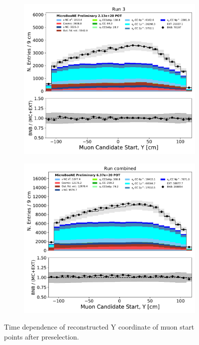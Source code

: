 \begin{figure}[hbt!]
\begin{center}
\begin{subfigure}[b]{0.35\textwidth}
    \end{subfigure}
    \begin{subfigure}[b]{0.35\textwidth}
        \centering
        \includegraphics[width=1.00\textwidth]{NuMuCCsel/Images/Ryan/Run3_nocrt/trk_sce_start_y_v_08052020_presel_samples_longest_noCRT_event_category.pdf}
    \end{subfigure} %
    \begin{subfigure}[b]{0.35\textwidth}
        \centering
        \includegraphics[width=1.00\textwidth]{NuMuCCsel/Images/Ryan/combined/trk_sce_start_y_v_08052020_presel_samples_longest_noCRT_event_category.pdf}
    \end{subfigure}
\caption{Time dependence of reconstructed Y coordinate of muon start points after preselection.}
\label{fig:NuMuCCsel:timedep:trkstarty}
\end{center}
\end{figure}

